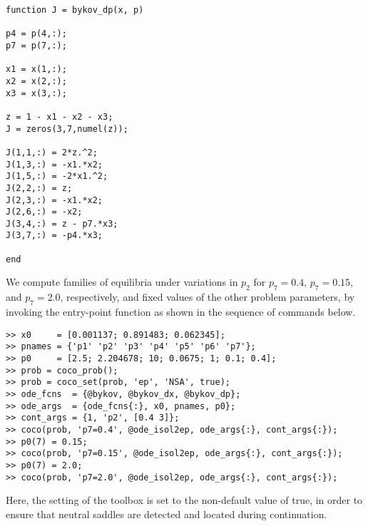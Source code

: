 \begin{lstlisting}[language=coco-highlight]
function J = bykov_dp(x, p)

p4 = p(4,:);
p7 = p(7,:);

x1 = x(1,:);
x2 = x(2,:);
x3 = x(3,:);

z = 1 - x1 - x2 - x3;
J = zeros(3,7,numel(z));

J(1,1,:) = 2*z.^2;
J(1,3,:) = -x1.*x2;
J(1,5,:) = -2*x1.^2;
J(2,2,:) = z;
J(2,3,:) = -x1.*x2;
J(2,6,:) = -x2;
J(3,4,:) = z - p7.*x3;
J(3,7,:) = -p4.*x3;

end
\end{lstlisting}

We compute families of equilibria under variations in $p_2$ for $p_7=0.4$, $p_7=0.15$, and $p_7=2.0$, respectively, and fixed values of the other problem parameters, by invoking the  entry-point function as shown in the sequence of commands below.
\begin{lstlisting}[language=coco-highlight]
>> x0     = [0.001137; 0.891483; 0.062345];
>> pnames = {'p1' 'p2' 'p3' 'p4' 'p5' 'p6' 'p7'};
>> p0     = [2.5; 2.204678; 10; 0.0675; 1; 0.1; 0.4];
>> prob = coco_prob();
>> prob = coco_set(prob, 'ep', 'NSA', true);
>> ode_fcns  = {@bykov, @bykov_dx, @bykov_dp};
>> ode_args  = {ode_fcns{:}, x0, pnames, p0};
>> cont_args = {1, 'p2', [0.4 3]};
>> coco(prob, 'p7=0.4', @ode_isol2ep, ode_args{:}, cont_args{:});
>> p0(7) = 0.15;
>> coco(prob, 'p7=0.15', @ode_isol2ep, ode_args{:}, cont_args{:});
>> p0(7) = 2.0;
>> coco(prob, 'p7=2.0', @ode_isol2ep, ode_args{:}, cont_args{:});
\end{lstlisting}
Here, the  setting of the  toolbox is set to the non-default value of true, in order to ensure that neutral saddles are detected and located during continuation.

